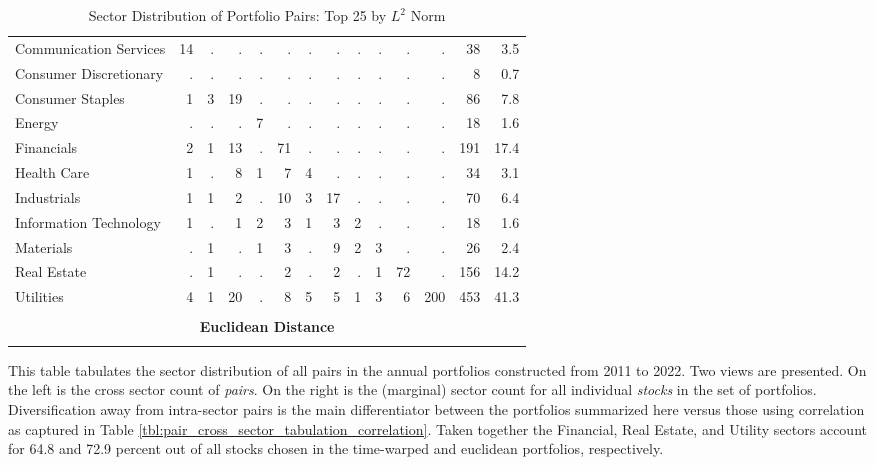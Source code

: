 \documentclass[12pt]{report}
\begin{document}
\begin{table}[hp]
\begin{tabular}{l r r r r r r r r r r r | r r}
        Communication Services   & 14 &  . &  . &  . &  . &  . &  . &  . &  . &  . &   . &  38 &  3.5 \\
        Consumer Discretionary   &  . &  . &  . &  . &  . &  . &  . &  . &  . &  . &   . &   8 &  0.7 \\
        Consumer Staples         &  1 &  3 & 19 &  . &  . &  . &  . &  . &  . &  . &   . &  86 &  7.8 \\
        Energy                   &  . &  . &  . &  7 &  . &  . &  . &  . &  . &  . &   . &  18 &  1.6 \\
        Financials               &  2 &  1 & 13 &  . & 71 &  . &  . &  . &  . &  . &   . & 191 & 17.4 \\
        Health Care              &  1 &  . &  8 &  1 &  7 &  4 &  . &  . &  . &  . &   . &  34 &  3.1 \\
        Industrials              &  1 &  1 &  2 &  . & 10 &  3 & 17 &  . &  . &  . &   . &  70 &  6.4 \\
        Information Technology   &  1 &  . &  1 &  2 &  3 &  1 &  3 &  2 &  . &  . &   . &  18 &  1.6 \\
        Materials                &  . &  1 &  . &  1 &  3 &  . &  9 &  2 &  3 &  . &   . &  26 &  2.4 \\
        Real Estate              &  . &  1 &  . &  . &  2 &  . &  2 &  . &  1 & 72 &   . & 156 & 14.2 \\
        Utilities                &  4 &  1 & 20 &  . &  8 &  5 &  5 &  1 &  3 &  6 & 200 & 453 & 41.3 \\
        \vspace{0.25 mm} \\
        \multicolumn{14}{c}{\textbf{Euclidean Distance}} \\
        \vspace{1 mm} \\
        \hline
    \end{tabular}
    \caption{Sector Distribution of Portfolio Pairs: Top 25 by $L^{2}$ Norm}
    \begin{tablenotes}
        \item{\footnotesize This table tabulates the sector distribution of all pairs in the annual portfolios constructed from 2011 to 2022. Two views are presented. On the left is the cross sector count of \textit{pairs}. On the right is the (marginal) sector count for all individual \textit{stocks} in the set of portfolios. Diversification away from intra-sector pairs is the main differentiator between the portfolios summarized here versus those using correlation as captured in Table \ref{tbl:pair_cross_sector_tabulation_correlation}. Taken together the Financial, Real Estate, and Utility sectors account for 64.8 and 72.9 percent out of all stocks chosen in the time-warped and euclidean portfolios, respectively.}
    \end{tablenotes}
    \label{tbl:pair_cross_sector_tabulation_L2_measures}
\end{table}
\end{document}
